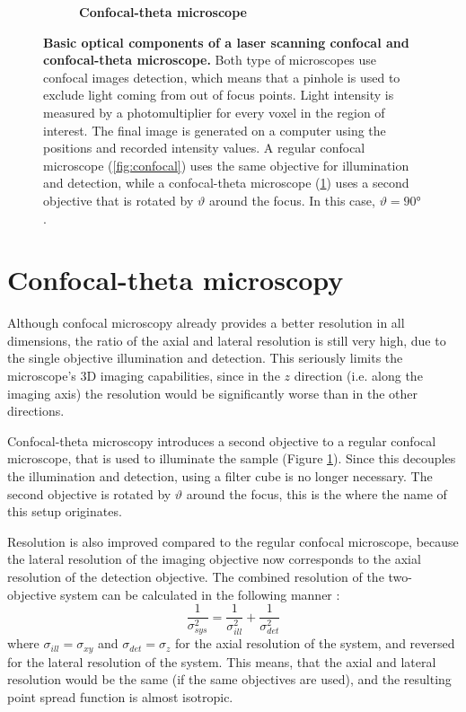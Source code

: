 \documentclass{tdk_style}
\begin{document}
\begin{figure}
\begin{subfigure}[t]{0.49\textwidth}
	\caption{\textbf{Confocal-theta microscope}}
	\label{fig:conf-theta}
\end{subfigure}
\caption{\textbf{Basic optical components of a laser scanning confocal and confocal-theta microscope.} Both type of microscopes use confocal images detection, which means that a pinhole is used to exclude light coming from out of focus points. Light intensity is measured by a photomultiplier for every voxel in the region of interest. The final image is generated on a computer using the positions and recorded intensity values. A regular confocal microscope (\ref{fig:confocal}) uses the same objective for illumination and detection, while a confocal-theta microscope (\ref{fig:conf-theta}) uses a second objective that is rotated by $\vartheta$ around the focus. In this case, $\vartheta = 90°$.}
\label{fig:confocals}
\end{figure}

\section{Confocal-theta microscopy}

Although confocal microscopy already provides a better resolution in all dimensions, the ratio of the axial and lateral resolution is still very high, due to the single objective illumination and detection. This seriously limits the microscope's 3D imaging capabilities, since in the $z$ direction (i.e. along the imaging axis) the resolution would be significantly worse than in the other directions.

Confocal-theta microscopy \cite{stelzer_fundamental_1994} introduces a second objective to a regular confocal microscope, that is used to illuminate the sample (Figure \ref{fig:conf-theta}). Since this decouples the illumination and detection, using a filter cube is no longer necessary. The second objective is rotated by $\vartheta$ around the focus, this is the where the name of this setup originates.

Resolution is also improved compared to the regular confocal microscope, because the lateral resolution of the imaging objective now corresponds to the axial resolution of the detection objective. The combined resolution of the two-objective system can be calculated in the following manner \cite{krzic_multiple-view_2009}:
\begin{equation}
\frac{1}{\sigma _{sys}^2} = \frac{1}{\sigma _{ill}^2} + \frac{1}{\sigma _{det}^2}
\end{equation}
where $\sigma_{ill} = \sigma_{xy}$ and $\sigma_{det} = \sigma_z$ for the axial resolution of the system, and reversed for the lateral resolution of the system. This means, that the axial and lateral resolution would be the same (if the same objectives are used), and the resulting point spread function is almost isotropic.
\end{document}

